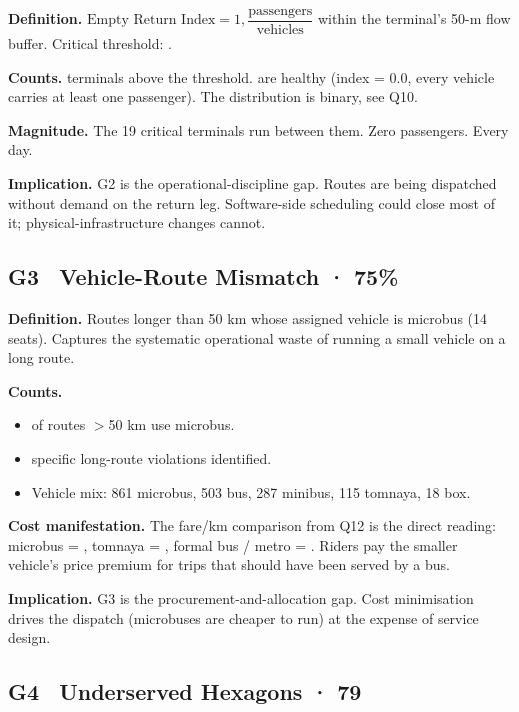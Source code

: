 \textbf{Definition.}
$\text{Empty Return Index} = 1, \dfrac{\text{passengers}}{\text{vehicles}}$ within the terminal's 50-m flow buffer.
Critical threshold: .

\textbf{Counts.}  terminals above the threshold.  are healthy
(index = 0.0, every vehicle carries at least one passenger). The
distribution is binary, see Q10.

\textbf{Magnitude.} The 19 critical terminals run  between them. Zero passengers. Every day.

\textbf{Implication.} G2 is the operational-discipline gap. Routes are
being dispatched without demand on the return leg. Software-side
scheduling could close most of it; physical-infrastructure changes
cannot.

\subsection{G3 \textbullet\ Vehicle-Route Mismatch · 75\%}

\textbf{Definition.} Routes longer than 50 km whose assigned vehicle is
microbus (14 seats). Captures the systematic operational waste of
running a small vehicle on a long route.

\textbf{Counts.}
\begin{itemize}
 \item {} of routes $>$50 km use microbus.
 \item {} specific long-route violations identified.
 \item Vehicle mix: 861 microbus, 503 bus, 287 minibus, 115 tomnaya, 18 box.
\end{itemize}

\textbf{Cost manifestation.} The fare/km comparison from Q12 is the
direct reading: microbus = , tomnaya = ,
formal bus / metro = . Riders pay the smaller
vehicle's price premium for trips that should have been served by a bus.

\textbf{Implication.} G3 is the procurement-and-allocation gap. Cost
minimisation drives the dispatch (microbuses are cheaper to run) at
the expense of service design.

\subsection{G4 \textbullet\ Underserved Hexagons · 79}

